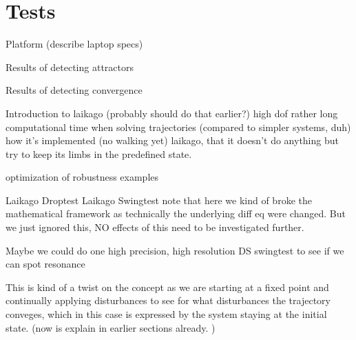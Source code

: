 \section{Tests}

    
    Platform (describe laptop specs)

    Results of detecting attractors

    Results of detecting convergence

    Introduction to laikago (probably should do that earlier?)
        high dof
        rather long computational time when solving trajectories (compared to simpler systems, duh)
        how it's implemented (no walking yet) laikago, that it doesn't do anything but try to keep its limbs in the predefined state.  

    optimization of robustness examples

    Laikago Droptest
    Laikago Swingtest
        note that here we kind of broke the mathematical framework as technically the underlying diff eq were changed. But we just ignored this, NO effects of this need to be investigated further. 


        Maybe we could do one high precision, high resolution DS swingtest to see if we can spot resonance 


    This is kind of a twist on the concept as we are starting at a fixed point and continually applying disturbances to see for what disturbances the trajectory conveges, which in this case is expressed by the system staying at the initial state. (now is explain in earlier sections already. )



























